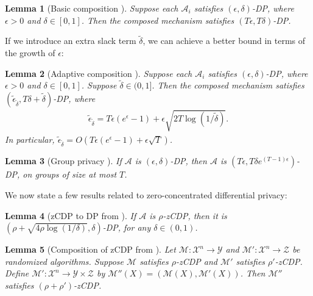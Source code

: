 \documentclass{article}
\newtheorem{lemma}{Lemma}
\begin{document}
\begin{lemma}[Basic composition \cite{DwoRot14}]
\label{LemBasic}
Suppose each $\mathcal{A}_i$ satisfies $(\epsilon, \delta)$-DP, where $\epsilon > 0$ and $\delta \in [0, 1]$. Then the composed mechanism satisfies $(T\epsilon, T\delta)$-DP.
\end{lemma}

If we introduce an extra slack term $\tilde{\delta}$, we can achieve a better bound in terms of the growth of $\epsilon$:

\begin{lemma}[Adaptive composition \cite{kairouz2015comp}]
\label{lemma:adapt_comp}  
Suppose each $\mathcal{A}_i$ satisfies $(\epsilon, \delta)$-DP, where $\epsilon > 0$ and $\delta \in [0, 1]$. Suppose $\tilde{\delta} \in (0, 1]$. Then the composed mechanism satisfies $(\tilde{\epsilon}_{\tilde{\delta}}, T\delta + \tilde{\delta})$-DP, where
\begin{align*}
\tilde{\epsilon}_{\tilde{\delta}} = T\epsilon(e^\epsilon - 1) + \epsilon\sqrt{2T\log(1/\tilde{\delta})}.
\end{align*}
In particular, $\tilde{\epsilon}_{\tilde{\delta}} = O(T\epsilon(e^\epsilon - 1) + \epsilon\sqrt{T})$.
\end{lemma}

\begin{lemma}[Group privacy \cite{vadhan2017complexity}]
\label{LemGroup}
If $\mathcal{A}$ is $(\epsilon, \delta)$-DP, then $\mathcal{A}$ is $(T\epsilon, T\delta e^{(T - 1)\epsilon})$-DP, on groups of size at most $T$.
\end{lemma}

We now state a few results related to zero-concentrated differential privacy:

\begin{lemma}[zCDP to DP from \cite{bun2016conc}]
\label{lemma:zCDP_to_DP}
If $\mathcal{A}$ is $\rho$-zCDP, then it is $\left(\rho + \sqrt{4\rho\log(1/\delta)}, \delta\right)$-DP, for any $\delta \in (0, 1)$. 
\end{lemma} 
\begin{lemma}[Composition of zCDP from \cite{bun2016conc}]
\label{lemma:Comp_zCDP}
Let $\mathcal{M} : \mathcal{X}^n \rightarrow \mathcal{Y}$ and $\mathcal{M}' : \mathcal{X}^n \rightarrow \mathcal{Z}$ be randomized algorithms. Suppose $\mathcal{M}$ satisfies $\rho$-zCDP and $\mathcal{M}'$ satisfies $\rho'$-zCDP. Define $\mathcal{M}' : \mathcal{X}^n \rightarrow \mathcal{Y} \times \mathcal{Z}$ by $\mathcal{M}''(X) = (\mathcal{M}(X), \mathcal{M}'(X))$. Then $\mathcal{M}''$ satisfies $(\rho + \rho')$-zCDP.    
\end{lemma}
\end{document}
